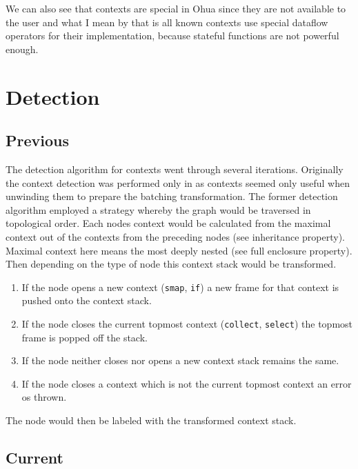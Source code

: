 We can also see that contexts are special in Ohua since they are not available to the user and what I mean by that is all known contexts use special dataflow operators for their implementation, because stateful functions are not powerful enough.


\section{Detection}

\subsection{Previous}

The detection algorithm for contexts went through several iterations.
Originally the context detection was performed only in \yauhau{} as contexts seemed only useful when unwinding them to prepare the batching transformation.
The former detection algorithm employed a strategy whereby the graph would be traversed in topological order.
Each nodes context would be calculated from the maximal context out of the contexts from the preceding nodes (see inheritance property).
Maximal context here means the most deeply nested (see full enclosure property).
Then depending on the type of node this context stack would be transformed.

\begin{enumerate}
  \item If the node opens a new context (\texttt{smap}, \texttt{if}) a new frame for that context is pushed onto the context stack.
  \item If the node closes the current topmost context (\texttt{collect}, \texttt{select}) the topmost frame is popped off the stack.
  \item If the node neither closes nor opens a new context stack remains the same.
  \item If the node closes a context which is not the current topmost context an error os thrown.
\end{enumerate}

The node would then be labeled with the transformed context stack.

\subsection{Current}


